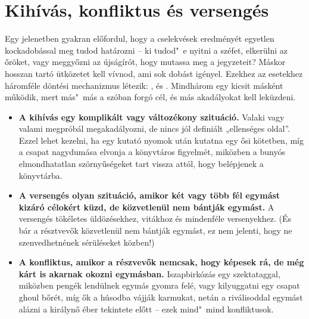 \chapter{Kihívás, konfliktus és versengés}

Egy jelenetben gyakran előfordul, hogy a cselekvések eredményét egyetlen kockadobással meg tudod határozni -- ki tudod"~e nyitni a széfet, elkerülni az őröket, vagy meggyőzni az újságírót, hogy mutassa meg a jegyzeteit? Máskor hosszan tartó ütközetet kell vívnod, ami sok dobást igényel. Ezekhez az esetekhez háromféle döntési mechanizmus létezik: ,  és . Mindhárom egy kicsit másként működik, mert más"~más a szóban forgó cél, és más akadályokat kell leküzdeni.

\begin{itemize}
    \item \textbf{A kihívás egy komplikált vagy változékony szituáció.} Valaki vagy valami megpróbál megakadályozni, de nincs jól definiált „ellenséges oldal”. Ezzel lehet kezelni, ha egy kutató nyomok után kutatna egy ősi kötetben, míg a csapat nagydumása elvonja a könyvtáros figyelmét, miközben a bunyós elmondhatatlan szörnyűségeket tart vissza attól, hogy belépjenek a könyvtárba.
    \item \textbf{A versengés olyan szituáció, amikor két vagy több fél egymást kizáró célokért küzd, de közvetlenül nem bántják egymást.} A versengés tökéletes üldözésekhez, vitákhoz és mindenféle versenyekhez. (És bár a résztvevők közvetlenül nem bántják egymást, ez nem jelenti, hogy ne szenvedhetnének sérüléseket közben!)
    \item \textbf{A konfliktus, amikor a részvevők nemcsak, hogy képesek rá, de még kárt is akarnak okozni egymásban.} Iszapbirkózás egy szektataggal, miközben pengék lendülnek egymás gyomra felé, vagy kilyuggatni egy csapat ghoul bőrét, míg ők a húsodba vájják karmukat, netán a riválisoddal egymást alázni a királynő éber tekintete előtt -- ezek mind"~mind konfliktusok.
\end{itemize}
